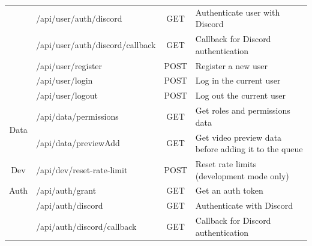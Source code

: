 \begin{table}[htbp]
\begin{tabular}{|c|l|c|p{5.5cm}|}
    \cline{2-4}
                            & /api/user/auth/discord          & GET                & Authenticate user with Discord                                                                                    \\
    \cline{2-4}
                            & /api/user/auth/discord/callback & GET                & Callback for Discord authentication                                                                               \\
    \cline{2-4}
                            & /api/user/register              & POST               & Register a new user                                                                                               \\
    \cline{2-4}
                            & /api/user/login                 & POST               & Log in the current user                                                                                           \\
    \cline{2-4}
                            & /api/user/logout                & POST               & Log out the current user                                                                                          \\
    \hline
    \multirow{2}{*}{Data}   & /api/data/permissions           & GET                & Get roles and permissions data                                                                                    \\
    \cline{2-4}
                            & /api/data/previewAdd            & GET                & Get video preview data before adding it to the queue                                                              \\
    \hline
    \multirow{1}{*}{Dev}    & /api/dev/reset-rate-limit       & POST               & Reset rate limits (development mode only)                                                                         \\
    \hline
    \multirow{1}{*}{Auth}   & /api/auth/grant                 & GET                & Get an auth token                                                                                                 \\
    \cline{2-4}
                            & /api/auth/discord               & GET                & Authenticate with Discord                                                                                         \\
    \cline{2-4}
                            & /api/auth/discord/callback      & GET                & Callback for Discord authentication                                                                               \\

\end{tabular}
\end{table}

